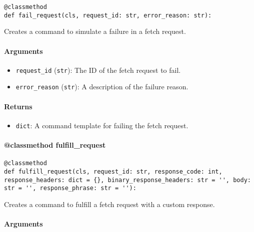 \documentclass{article}
\begin{document}
\begin{lstlisting}[style=pythonstyle]
@classmethod
def fail_request(cls, request_id: str, error_reason: str):
\end{lstlisting}

\noindent Creates a command to simulate a failure in a fetch request.

\paragraph{Arguments}

\begin{itemize}
    \item \lstinline[style=pythonstyle]|request_id| (\lstinline[style=pythonstyle]|str|): The ID of the fetch request to fail.
    \item \lstinline[style=pythonstyle]|error_reason| (\lstinline[style=pythonstyle]|str|): A description of the failure reason.
\end{itemize}

\paragraph{Returns}

\begin{itemize}
    \item \lstinline[style=pythonstyle]|dict|: A command template for failing the fetch request.
\end{itemize}

\paragraph{@classmethod fulfill\_request}

\begin{lstlisting}[style=pythonstyle]
@classmethod
def fulfill_request(cls, request_id: str, response_code: int, response_headers: dict = {}, binary_response_headers: str = '', body: str = '', response_phrase: str = ''):
\end{lstlisting}

\noindent Creates a command to fulfill a fetch request with a custom response.

\paragraph{Arguments}
\end{document}

